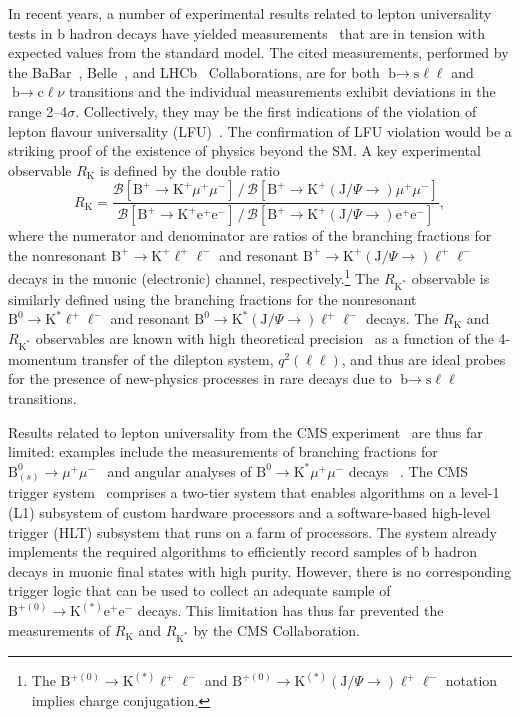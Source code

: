 \documentclass{webofc}
\newcommand{\kjpsi}{\ensuremath{(\textrm{J}/\Psi{\rightarrow})}\xspace}
\newcommand{\ellell}{\ensuremath{\ell^+\ell^-}\xspace}
\newcommand{\ee}{\ensuremath{\textrm{e}^+\textrm{e}^-}\xspace}
\newcommand{\mumu}{\ensuremath{\mu^+\mu^-}\xspace}
\newcommand{\bto}{\ensuremath{\textrm{b}{\rightarrow}}\xspace}
\newcommand{\btok}{\ensuremath{\textrm{B}^+{\rightarrow}\textrm{K}^+}\xspace}
\newcommand{\btokst}{\ensuremath{\textrm{B}^0{\rightarrow}\textrm{K}^*}\xspace}
\newcommand{\btokstar}{\ensuremath{\textrm{B}^{+(0)}{\rightarrow}\textrm{K}^{(*)}}\xspace}
\newcommand{\btokll}{\ensuremath{\btok\ellell}\xspace}
\newcommand{\btokmm}{\ensuremath{\btok\mumu}\xspace}
\newcommand{\btokee}{\ensuremath{\btok\ee}\xspace}
\newcommand{\btokjpsill}{\ensuremath{\btok\kjpsi\ellell}\xspace}
\newcommand{\btokjpsimm}{\ensuremath{\btok\kjpsi\mumu}\xspace}
\newcommand{\btokjpsiee}{\ensuremath{\btok\kjpsi\ee}\xspace}
\newcommand{\rk}{\ensuremath{R_{\textrm{K}}}\xspace}
\newcommand{\btokstll}{\ensuremath{\btokst\ellell}\xspace}
\newcommand{\btokstmm}{\ensuremath{\btokst\mumu}\xspace}
\newcommand{\btokstjpsill}{\ensuremath{\btokst\kjpsi\ellell}\xspace}
\newcommand{\rkst}{\ensuremath{R_{\textrm{K}^*}}\xspace}
\newcommand{\btokstarll}{\ensuremath{\btokstar\ellell}\xspace}
\newcommand{\btokstaree}{\ensuremath{\btokstar\ee}\xspace}
\newcommand{\btokstarjpsill}{\ensuremath{\btokstar\kjpsi\ellell}\xspace}
\newcommand{\bsll}{\ensuremath{\bto\textrm{s}\ell\ell}\xspace}
\newcommand{\bclnu}{\ensuremath{\bto\textrm{c}\ell\nu}\xspace}
\newcommand{\bstomm}{\ensuremath{\textrm{B}^0_{(s)}{\rightarrow}\mumu}\xspace}
\begin{document}
In recent years, a number of experimental results related to lepton
universality tests in b hadron decays have yielded
measurements~\cite{rk-lhcb-1, rkst-lhcb-1, rkst-belle-1, rd-babar-1,
  rd-belle-1, rd-lhcb-1, p5prime-lhcb-1, p5prime-belle-1, ang-babar-1}
that are in tension with expected values from the standard model. The
cited measurements, performed by the BaBar~\cite{babar},
Belle~\cite{belle}, and LHCb~\cite{lhcb} Collaborations, are for both
\bsll and \bclnu transitions and the individual measurements exhibit
deviations in the range 2--4$\sigma$.  Collectively, they may be the
first indications of the violation of lepton flavour universality
(LFU)~\cite{hflav-rdrdst, altmannshofer}. The confirmation of LFU
violation would be a striking proof of the existence of physics beyond
the SM. A key experimental observable \rk is defined by the double
ratio %
\begin{equation}
  \rk =
  \frac{\mathcal{B}[\btokmm]\,/\,\mathcal{B}[\btokjpsimm]}{\mathcal{B}[\btokee]\,/\,\mathcal{B}[\btokjpsiee]}, 
  \label{equ:1}
\end{equation}
where the numerator and denominator are ratios of the branching
fractions for the nonresonant \btokll and resonant \btokjpsill decays
in the muonic (electronic) channel, respectively.\footnote{The
  \btokstarll and \btokstarjpsill notation implies charge
  conjugation.} The \rkst observable is similarly defined using the
branching fractions for the nonresonant \btokstll and resonant
\btokstjpsill decays. The \rk and \rkst observables are known with
high theoretical precision~\cite{theory1, theory2} as a function of
the 4-momentum transfer of the dilepton system, $q^2(\ell\ell)$, and
thus are ideal probes for the presence of new-physics processes in
rare decays due to \bsll transitions.

Results related to lepton universality from the CMS
experiment~\cite{cms-expt} are thus far limited: examples include the
measurements of branching fractions for \bstomm~\cite{bsmumu} and
angular analyses of \btokstmm decays ~\cite{p5prime-cms}. The CMS
trigger system~\cite{cms-trigger} comprises a two-tier system that
enables algorithms on a level-1 (L1) subsystem of custom hardware
processors and a software-based high-level trigger (HLT) subsystem
that runs on a farm of processors. The system already implements the
required algorithms to efficiently record samples of b hadron decays
in muonic final states with high purity. However, there is no
corresponding trigger logic that can be used to collect an adequate
sample of \btokstaree decays. This limitation has thus far prevented
the measurements of \rk and \rkst by the CMS Collaboration.
\end{document}
